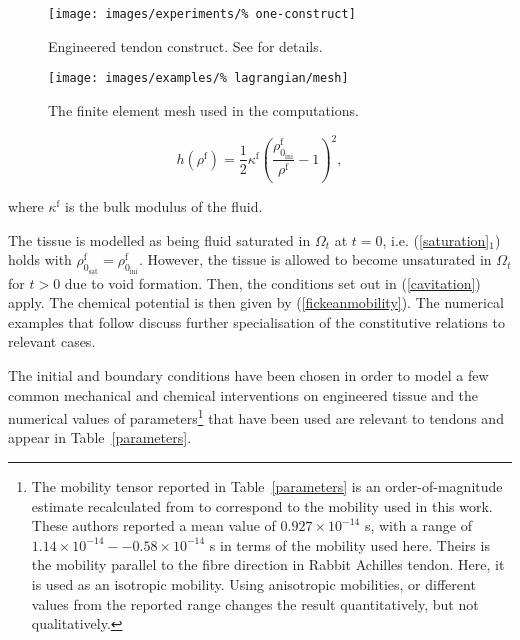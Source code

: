 \begin{figure}[ht]
  \centering
  \texttt{[image: images/experiments/\%
    one-construct]}
  \caption{Engineered tendon construct. See \citet{Calve:04} for
    details.} 
  \label{engconst}
\end{figure}

\begin{figure}[ht]
  \centering
  \texttt{[image: images/examples/\%
    lagrangian/mesh]}
  \caption{The finite element mesh used in the computations.}
  \label{egmesh}
\end{figure}

\begin{equation}
 h(\rho^\mathrm{f}) =
\frac{1}{2}\kappa^\mathrm{f}\left(
\frac{\rho_{0_\mathrm{ini}}^\mathrm{f}}{\rho^\mathrm{f}}
- 1\right)^2,
\end{equation}

\noindent where $\kappa^\mathrm{f}$ is the bulk modulus of the fluid.

The tissue is modelled as being fluid saturated in $\Omega_t$ at $t =
0$, i.e. (\ref{saturation}$_1$) holds with
$\rho^\mathrm{f}_{0_\mathrm{sat}} =
\rho^\mathrm{f}_{0_\mathrm{ini}}$. However, the tissue is allowed to
become unsaturated in $\Omega_t$ for $t > 0$ due to void
formation. Then, the conditions set out in (\ref{cavitation})
apply. The chemical potential is then given by
(\ref{fickeanmobility}). The numerical examples that follow discuss
further specialisation of the constitutive relations to relevant
cases.

The initial and boundary conditions have been chosen in order to model
a few common mechanical and chemical interventions on engineered
tissue and the numerical values of parameters\footnote{The mobility
  tensor reported in Table~\ref{parameters} is an order-of-magnitude
  estimate recalculated from \citet{Hanetal:2000} to correspond to the
  mobility used in this work. These authors reported a mean value of
  $0.927\times 10^{-14}$ s, with a range of $1.14\times
  10^{-14}--0.58\times 10^{-14}$ s in terms of the mobility used
  here. Theirs is the mobility parallel to the fibre direction in
  Rabbit Achilles tendon. Here, it is used as an isotropic
  mobility. Using anisotropic mobilities, or different values from the
  reported range changes the result quantitatively, but not
  qualitatively.} that have been used are relevant to tendons and
appear in Table~\ref{parameters}.

